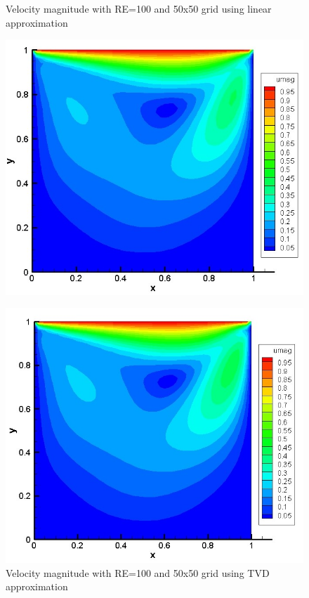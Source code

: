 \documentclass[12pt]{elsarticle}
\begin{document}
	\begin{figure}[h]
		\caption{Velocity magnitude with RE=100 and 50x50 grid using linear approximation}
		\centering\includegraphics[width=0.8\linewidth]{1_50_50_re_100_velocity_linear}
		\label{start:50x50_RE:100}
		\caption{Velocity magnitude with RE=100 and 50x50 grid using TVD approximation}
		\centering\includegraphics[width=0.8\linewidth]{2_50_50_re_100_velocity_tvd}
	\end{figure}
	
\end{document}

